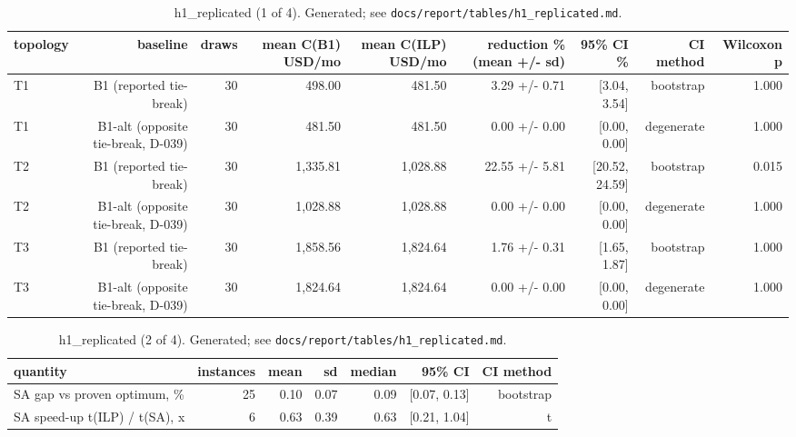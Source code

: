 \begin{table}[t]
\centering
\small
\begin{tabular}{lrrrrrrrr}
\toprule
topology & baseline & draws & mean C(B1) USD/mo & mean C(ILP) USD/mo & reduction \% (mean +/- sd) & 95\% CI \% & CI method & Wilcoxon p \\
\midrule
T1 & B1 (reported tie-break) & 30 & 498.00 & 481.50 & 3.29 +/- 0.71 & [3.04, 3.54] & bootstrap & 1.000 \\
T1 & B1-alt (opposite tie-break, D-039) & 30 & 481.50 & 481.50 & 0.00 +/- 0.00 & [0.00, 0.00] & degenerate & 1.000 \\
T2 & B1 (reported tie-break) & 30 & 1,335.81 & 1,028.88 & 22.55 +/- 5.81 & [20.52, 24.59] & bootstrap & 0.015 \\
T2 & B1-alt (opposite tie-break, D-039) & 30 & 1,028.88 & 1,028.88 & 0.00 +/- 0.00 & [0.00, 0.00] & degenerate & 1.000 \\
T3 & B1 (reported tie-break) & 30 & 1,858.56 & 1,824.64 & 1.76 +/- 0.31 & [1.65, 1.87] & bootstrap & 1.000 \\
T3 & B1-alt (opposite tie-break, D-039) & 30 & 1,824.64 & 1,824.64 & 0.00 +/- 0.00 & [0.00, 0.00] & degenerate & 1.000 \\
\bottomrule
\end{tabular}
\caption{h1\_replicated (1 of 4). Generated; see \texttt{docs/report/tables/h1\_replicated.md}.}
\label{tab:h1_replicated-1}
\end{table}

\begin{table}[t]
\centering
\small
\begin{tabular}{lrrrrrr}
\toprule
quantity & instances & mean & sd & median & 95\% CI & CI method \\
\midrule
SA gap vs proven optimum, \% & 25 & 0.10 & 0.07 & 0.09 & [0.07, 0.13] & bootstrap \\
SA speed-up t(ILP) / t(SA), x & 6 & 0.63 & 0.39 & 0.63 & [0.21, 1.04] & t \\
\bottomrule
\end{tabular}
\caption{h1\_replicated (2 of 4). Generated; see \texttt{docs/report/tables/h1\_replicated.md}.}
\label{tab:h1_replicated-2}
\end{table}

